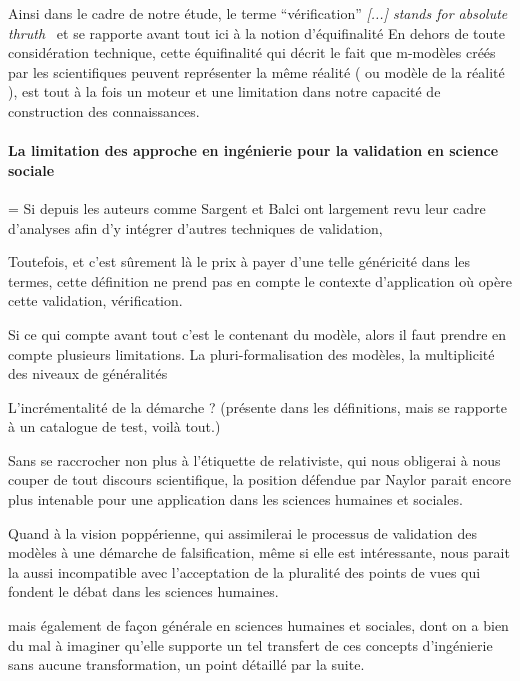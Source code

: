 Ainsi dans le cadre de notre étude, le terme \enquote{vérification}  \textit{[...] stands for absolute thruth } \autocite{David2009} \autocite{Oreskes1994} et se rapporte avant tout ici à la notion d'équifinalité \autocite{OSullivan2004} En dehors de toute considération technique, cette équifinalité qui décrit le fait que m-modèles créés par les scientifiques peuvent représenter la même réalité ( ou modèle de la réalité ), est tout à la fois un moteur et une limitation dans notre capacité de construction des connaissances. 



\paragraph{La limitation des approche en ingénierie pour la validation en science sociale}

= Si depuis les auteurs comme Sargent et Balci ont largement revu leur cadre d'analyses afin d'y intégrer d'autres techniques de validation, 

Toutefois, et c'est sûrement là le prix à payer d'une telle généricité dans les termes, cette définition ne prend pas en compte le contexte d'application où opère cette validation, vérification. 

Si ce qui compte avant tout c'est le contenant du modèle, alors il faut prendre en compte plusieurs limitations. La pluri-formalisation des modèles, la multiplicité des niveaux de généralités 

L'incrémentalité de la démarche ? (présente dans les définitions, mais se rapporte à un catalogue de test, voilà tout.)

Sans se raccrocher non plus à l'étiquette de relativiste, qui nous obligerai à nous couper de tout discours scientifique, la position défendue par Naylor parait encore plus intenable pour une application dans les sciences humaines et sociales.

Quand à la vision poppérienne, qui assimilerai le processus de validation des modèles à une démarche de falsification, même si elle est intéressante, nous parait la aussi incompatible avec l'acceptation de la pluralité des points de vues qui fondent le débat dans les sciences humaines.



mais également de façon générale en sciences humaines et sociales, dont on a bien du mal à imaginer qu'elle supporte un tel transfert de ces concepts d’ingénierie sans aucune transformation, un point détaillé par la suite.




